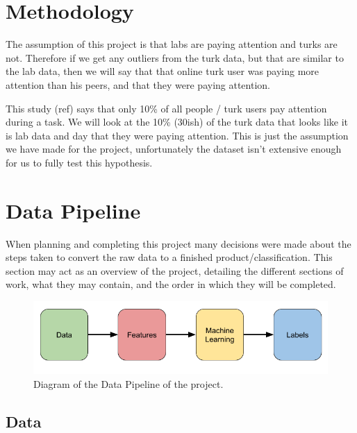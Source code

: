 \documentclass{article}
\begin{document}

\section{Methodology}

 The assumption of this project is that labs are paying attention and turks are not. Therefore if we get any outliers from the turk data, but that are similar to the lab data, then we will say that that online turk user was paying more attention than his peers, and that they were paying attention.

This study (ref) says that only 10\% of all people / turk users pay attention during a task.
We will look at the 10\% (30ish) of the turk data that looks like it is lab data and day that they were paying attention.
This is just the assumption we have made for the project, 
unfortunately the dataset isn't extensive enough for us to fully test this hypothesis.

\section{Data Pipeline}

When planning and completing this project many decisions were made about the steps taken to convert the raw data to a finished product/classification.
This section may act as an overview of the project, detailing the different sections of work, what they may contain, and the order in which they will be completed.

\begin{figure}[ht]
    \centering
    \includegraphics[scale=0.55]{Images/Data-Pipeline.png}
    \caption{Diagram of the Data Pipeline of the project.}
    \label{fig:test}
\end{figure}


\subsection{Data}
\end{document}
